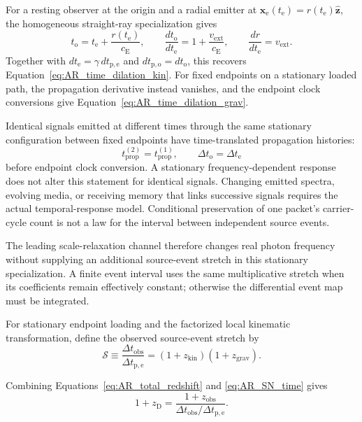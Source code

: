For a resting observer at the origin and a radial emitter at
\(\mathbf x_{\mathrm e}(t_{\mathrm e})=r(t_{\mathrm e})\hat{\mathbf z}\),
the homogeneous straight-ray specialization gives
\[
    t_{\mathrm o}=t_{\mathrm e}+\frac{r(t_{\mathrm e})}{c_{\mathrm E}},
    \qquad
    \frac{dt_{\mathrm o}}{dt_{\mathrm e}}
    =1+\frac{v_{\mathrm{ext}}}{c_{\mathrm E}},
    \qquad
    \frac{dr}{dt_{\mathrm e}}=v_{\mathrm{ext}}.
\]
Together with \(dt_{\mathrm e}=\gamma\,dt_{\mathrm{p,e}}\) and
\(dt_{\mathrm{p,o}}=dt_{\mathrm o}\), this recovers
Equation~\eqref{eq:AR_time_dilation_kin}. For fixed endpoints on a stationary
loaded path, the propagation derivative instead vanishes, and the endpoint
clock conversions give Equation~\eqref{eq:AR_time_dilation_grav}.

Identical signals emitted at different times through the same stationary
configuration between fixed endpoints have time-translated propagation
histories:
\[
    t_{\mathrm{prop}}^{(2)}=t_{\mathrm{prop}}^{(1)},
    \qquad
    \Delta t_{\mathrm o}=\Delta t_{\mathrm e}
\]
before endpoint clock conversion. A stationary frequency-dependent response
does not alter this statement for identical signals. Changing emitted
spectra, evolving media, or receiving memory that links successive signals
requires the actual temporal-response model. Conditional preservation of one
packet's carrier-cycle count is not a law for the interval between independent
source events.

The leading scale-relaxation channel therefore changes real photon frequency
without supplying an additional source-event stretch in this stationary
specialization. A finite event interval uses the same multiplicative stretch
when its coefficients remain effectively constant; otherwise the differential
event map must be integrated.

For stationary endpoint loading and the factorized local kinematic
transformation, define the observed source-event stretch by
\begin{equation}
    \boxed{
    \mathcal S
    \equiv
    \frac{
        \Delta t_{\mathrm{obs}}
    }{
        \Delta t_{\mathrm{p,e}}
    }
    =
    (1+z_{\mathrm{kin}})
    (1+z_{\mathrm{grav}}).
    }
    \label{eq:AR_SN_time}
\end{equation}

Combining Equations~\eqref{eq:AR_total_redshift} and
\eqref{eq:AR_SN_time} gives
\begin{equation}
    \boxed{
    1+z_{\mathrm D}
    =
    \frac{
        1+z_{\mathrm{obs}}
    }{
        \Delta t_{\mathrm{obs}}/\Delta t_{\mathrm{p,e}}
    }.
    }
    \label{eq:AR_SN_decomposition}
\end{equation}


